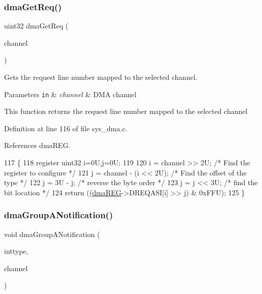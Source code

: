 \subsubsection{\texorpdfstring{dma\+Get\+Req()}{dmaGetReq()}}
{\footnotesize\ttfamily uint32 dma\+Get\+Req (\begin{DoxyParamCaption}\item[{uint32}]{channel }\end{DoxyParamCaption})}



Gets the request line number mapped to the selected channel. 


\begin{DoxyParams}[1]{Parameters}
\mbox{\tt in}  & {\em channel} & D\+MA channel\\
\hline
\end{DoxyParams}
This function returns the request line number mapped to the selected channel 

Definition at line 116 of file sys\+\_\+dma.\+c.



References dma\+R\+EG.


\begin{DoxyCode}
117 \{
118     \textcolor{keyword}{register} uint32 i=0U,j=0U;
119 
120     i = channel >> 2U;              \textcolor{comment}{/* Find the register to configure */}
121     j = channel - (i << 2U);        \textcolor{comment}{/* Find the offset of the type    */}
122     j = 3U - j;                     \textcolor{comment}{/* reverse the byte order         */}
123     j = j << 3U;                    \textcolor{comment}{/* find the bit location          */}
124     \textcolor{keywordflow}{return} ((\mbox{\hyperlink{reg__dma_8h_aae27308852f460efc99fcbf6eb47ea86}{dmaREG}}->DREQASI[i] >> j) & 0xFFU);
125 \}
\end{DoxyCode}
\mbox{\label{group__DMA_ga27a1d2fda92f10191a0c54ed6227c22e}} 
\subsubsection{\texorpdfstring{dma\+Group\+A\+Notification()}{dmaGroupANotification()}}
{\footnotesize\ttfamily void dma\+Group\+A\+Notification (\begin{DoxyParamCaption}\item[{dma\+Interrupt\+\_\+t}]{inttype,  }\item[{uint32}]{channel }\end{DoxyParamCaption})}




